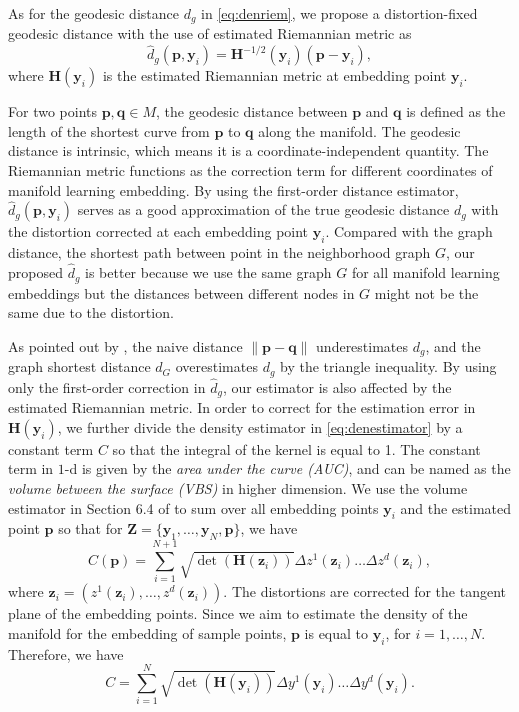 \documentclass[11pt,a4paper,]{article}
\begin{document}
As for the geodesic distance \(d_g\) in \eqref{eq:denriem}, we propose a distortion-fixed geodesic distance with the use of estimated Riemannian metric as
\begin{equation}
\label{eq:dgestimate}
\hat{d}_g(\pmb{p}, \pmb{y}_i) = \pmb{H}^{-1/2}(\pmb{y}_i) (\pmb{p} - \pmb{y}_i),
\end{equation}
where \(\pmb{H}(\pmb{y}_i)\) is the estimated Riemannian metric at embedding point \(\pmb{y}_i\).

For two points \(\pmb{p},\pmb{q} \in M\), the geodesic distance between \(\pmb{p}\) and \(\pmb{q}\) is defined as the length of the shortest curve from \(\pmb{p}\) to \(\pmb{q}\) along the manifold.
The geodesic distance is intrinsic, which means it is a coordinate-independent quantity. The Riemannian metric functions as the correction term for different coordinates of manifold learning embedding.
By using the first-order distance estimator, \(\hat{d}_g(\pmb{p}, \pmb{y}_i)\) serves as a good approximation of the true geodesic distance \(d_g\) with the distortion corrected at each embedding point \(\pmb{y}_i\). Compared with the graph distance, the shortest path between point in the neighborhood graph \(G\), our proposed \(\hat{d}_g\) is better because we use the same graph \(G\) for all manifold learning embeddings but the distances between different nodes in \(G\) might not be the same due to the distortion.

As pointed out by \textcite{Perrault-Joncas2013-pq}, the naive distance \(\|\pmb{p}-\pmb{q}\|\) underestimates \(d_g\), and the graph shortest distance \(d_G\) overestimates \(d_g\) by the triangle inequality. By using only the first-order correction in \(\hat{d}_g\), our estimator is also affected by the estimated Riemannian metric. In order to correct for the estimation error in \(\pmb{H}(\pmb{y}_i)\), we further divide the density estimator in \eqref{eq:denestimator} by a constant term \(C\) so that the integral of the kernel is equal to 1. The constant term in \(1\)-d is given by the \emph{area under the curve (AUC)}, and can be named as the \emph{volume between the surface (VBS)} in higher dimension. We use the volume estimator in Section 6.4 of \textcite{Perrault-Joncas2013-pq} to sum over all embedding points \(\pmb{y}_i\) and the estimated point \(\pmb{p}\) so that for \(\pmb{Z} = \{\pmb{y}_1, \dots, \pmb{y}_N, \pmb{p}\}\), we have
\begin{equation}
\label{eq:vbs}
C(\pmb{p}) = \sum_{i=1}^{N+1} \sqrt{\det(\pmb{H}(\pmb{z}_i))} \Delta z^1(\pmb{z}_i)\dots \Delta z^d(\pmb{z}_i),
\end{equation}
where \(\pmb{z}_i=(z^1(\pmb{z}_i),\dots, z^d(\pmb{z}_i))\). The distortions are corrected for the tangent plane of the embedding points. Since we aim to estimate the density of the manifold for the embedding of sample points, \(\pmb{p}\) is equal to \(\pmb{y}_i\), for \(i=1,\dots,N\). Therefore, we have
\begin{equation}
\label{eq:vbsyi}
C = \sum_{i=1}^{N} \sqrt{\det(\pmb{H}(\pmb{y}_i))} \Delta y^1(\pmb{y}_i)\dots \Delta y^d(\pmb{y}_i).
\end{equation}
\end{document}

